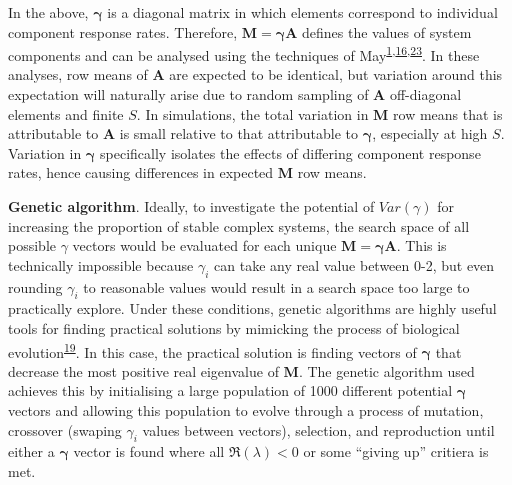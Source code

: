 \documentclass[]{article}
\begin{document}
In the above, \(\mathbf{\gamma}\) is a diagonal matrix in which elements
correspond to individual component response rates. Therefore,
\(\mathbf{M} = \mathbf{\gamma} \mathbf{A}\) defines the values of system
components and can be analysed using the techniques of
May\textsuperscript{\protect\hyperlink{ref-May1972}{1},\protect\hyperlink{ref-Ahmadian2015}{16},\protect\hyperlink{ref-May1973}{23}}.
In these analyses, row means of \(\mathbf{A}\) are expected to be
identical, but variation around this expectation will naturally arise
due to random sampling of \(\mathbf{A}\) off-diagonal elements and
finite \(S\). In simulations, the total variation in \(\mathbf{M}\) row
means that is attributable to \(\mathbf{A}\) is small relative to that
attributable to \(\mathbf{\gamma}\), especially at high \(S\). Variation
in \(\mathbf{\gamma}\) specifically isolates the effects of differing
component response rates, hence causing differences in expected
\(\mathbf{M}\) row means.

\textbf{Genetic algorithm}. Ideally, to investigate the potential of
\(Var(\gamma)\) for increasing the proportion of stable complex systems,
the search space of all possible \(\gamma\) vectors would be evaluated
for each unique \(\mathbf{M = \gamma A}\). This is technically
impossible because \(\gamma_{i}\) can take any real value between 0-2,
but even rounding \(\gamma_{i}\) to reasonable values would result in a
search space too large to practically explore. Under these conditions,
genetic algorithms are highly useful tools for finding practical
solutions by mimicking the process of biological
evolution\textsuperscript{\protect\hyperlink{ref-Hamblin2013}{19}}. In
this case, the practical solution is finding vectors of
\(\mathbf{\gamma}\) that decrease the most positive real eigenvalue of
\(\mathbf{M}\). The genetic algorithm used achieves this by initialising
a large population of 1000 different potential \(\mathbf{\gamma}\)
vectors and allowing this population to evolve through a process of
mutation, crossover (swaping \(\gamma_{i}\) values between vectors),
selection, and reproduction until either a \(\mathbf{\gamma}\) vector is
found where all \(\Re(\lambda) < 0\) or some ``giving up'' critiera is
met.
\end{document}
